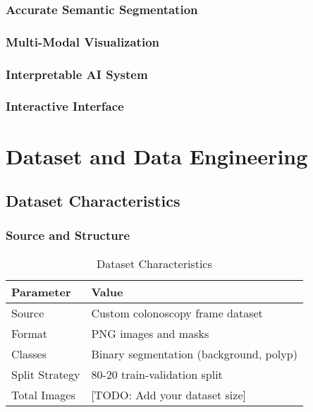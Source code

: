 \documentclass[12pt,a4paper]{report}
\begin{document}
\subsubsection{Accurate Semantic Segmentation}

\subsubsection{Multi-Modal Visualization}

\subsubsection{Interpretable AI System}

\subsubsection{Interactive Interface}

\section{Dataset and Data Engineering}

\subsection{Dataset Characteristics}

\subsubsection{Source and Structure}

\begin{table}[H]
\centering
\caption{Dataset Characteristics}
\begin{tabular}{|l|p{10cm}|}
\hline
\textbf{Parameter} & \textbf{Value} \\
\hline
Source & Custom colonoscopy frame dataset \\
\hline
Format & PNG images and masks \\
\hline
Classes & Binary segmentation (background, polyp) \\
\hline
Split Strategy & 80-20 train-validation split \\
\hline
Total Images & [TODO: Add your dataset size] \\
\hline
\end{tabular}
\end{table}
\end{document}
